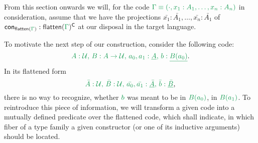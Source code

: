 \documentclass[12pt,headings=optiontohead,openany,oneside,a4paper]{book}
\theoremstyle{definition}
\newcommand{\UU}{\mathcal{U}}
\newcommand{\gr}[1]{{\color{ForestGreen}#1}}
\newcommand{\grm}[1]{\ensuremath{\gr{#1}}}
\newcommand{\blm}[1]{\ensuremath{{\color{Black}#1}}}
\newcommand{\CC}{\mathsf{C}}
\newcommand{\con}{\mathsf{con}}
\newcommand{\flatten}[1]{\blm{\mathsf{flatten}(\grm{#1})}}
\begin{document}
From this section onwards we will, for the code $\grm{\Gamma \equiv (\cdot, x_1 : A_1, \ldots, x_n : A_n)}$
in consideration, assume that we have the projections $\bar{x_1} : \bar{A_1}, \ldots, \bar{x_n} : \bar{A_1}$ of
$\con_{\flatten{\Gamma}} : \flatten{\Gamma}^\CC$ at our disposal in the target
language.

To motivate the next step of our construction, consider the following code:
\begin{equation*}
\grm{
A : \UU,\, B : A \to \UU,\, a_0, a_1 : \underline{A},\, b : \underline{B(a_0)}
} \text{.}
\end{equation*}
In its flattened form
\begin{equation*}
\grm{
\bar{A} : \UU,\, \bar{B} : \UU,\, \bar{a_0}, \bar{a_1} : \underline{\bar{A}},\, \bar{b} : \underline{\bar{B}}
} \text{,}
\end{equation*}
there is no way to recognize, whether \grm{b} was meant to be in \grm{B(a_0)},
in \grm{B(a_1)}.
To reintroduce this piece of information, we will transform a given code into a
mutually defined predicate over the flattened code, which shall indicate, in which
fiber of a type family a given constructor (or one of its inductive arguments)
should be located.
\end{document}
